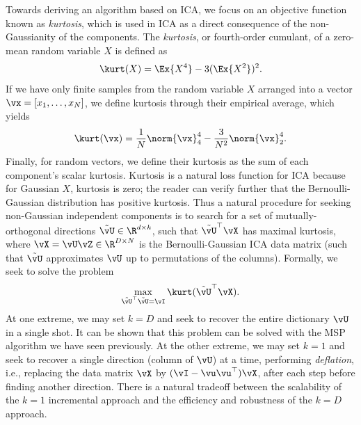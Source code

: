 \documentclass[../../book-main.tex]{subfiles}
\begin{document}
Towards deriving an algorithm based on ICA, we focus on an objective
function known as \textit{kurtosis}, which is used in ICA as a direct
consequence of the non-Gaussianity of the components. The
\textit{kurtosis}, or fourth-order cumulant, of a zero-mean random
variable $X$ is defined as
\begin{equation}\label{eq:kurtosis}
    \kurt(X) = \Ex{X^4} - 3 (\Ex{X^2})^2.
\end{equation}
If we have only finite samples from the random variable $X$ arranged
into a vector $\vx = [x_1, \dots, x_N]$, we define kurtosis through
their empirical average, which yields
\begin{equation}\label{eq:kurtosis-vector}
    \kurt(\vx) = \frac{1}{N} \norm{\vx}_4^4 - \frac{3}{N^2} \norm{\vx}_2^4.
\end{equation}
Finally, for random vectors, we define their kurtosis as the sum of
each component's scalar kurtosis.
Kurtosis is a natural loss function for ICA because for Gaussian $X$,
kurtosis is zero; the reader can verify further that the
Bernoulli-Gaussian distribution has positive kurtosis.
Thus a natural procedure for seeking non-Gaussian independent
components is to search for a set of mutually-orthogonal directions
$\tilde{\vU} \in \R^{d \times k}$, such that $\tilde{\vU}^\top \vX$ has maximal
kurtosis, where $\vX = \vU \vZ \in \R^{D \times N}$ is the
Bernoulli-Gaussian ICA data matrix (such that $\tilde{\vU}$ approximates
$\vU$ up to permutations of the columns).
Formally, we seek to solve the problem
\begin{equation}
    \max_{\tilde{\vU}^\top \tilde{\vU} = \vI} \kurt(\tilde{\vU}^\top \vX).
\end{equation}
At one extreme, we may set $k = D$ and seek to recover the entire dictionary
$\vU$ in a single shot.  It can be shown that this problem can be solved with
the MSP algorithm we have seen previously.
At the other extreme, we may set $k=1$ and seek to recover a single
direction (column of $\vU$) at a time, performing \textit{deflation},
i.e., replacing the data matrix $\vX$ by $(\vI - \vu\vu^\top) \vX$,
after each step before finding another direction.
There is a natural tradeoff between the scalability of the $k=1$
incremental approach and the efficiency and robustness of the $k=D$ approach.
\end{document}
